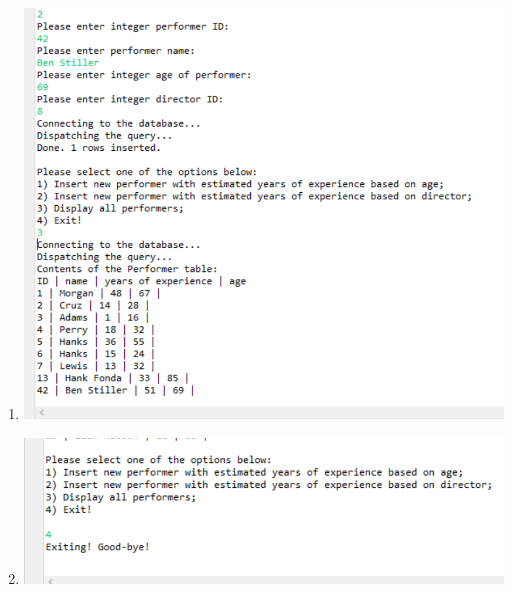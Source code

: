 \documentclass[11pt]{article}
\begin{document}
\begin{enumerate}
\item \includegraphics[width = \textwidth]{Insert2.2.png}
\item \includegraphics[width = \textwidth]{exiting.png}   


\end{enumerate}
\end{document}
